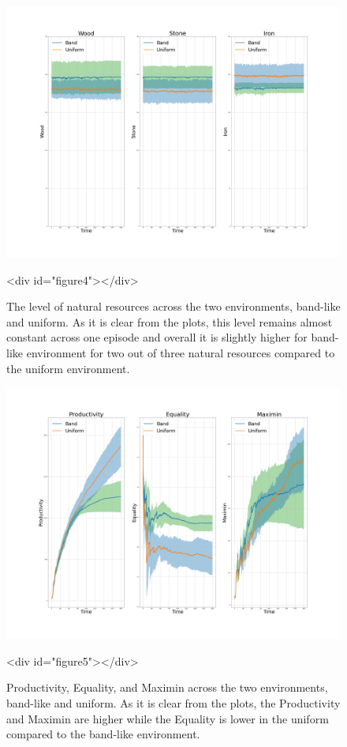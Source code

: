 \documentclass{article}
\begin{document}
\begin{figure}
\centering
\includegraphics[width=0.7\linewidth]{"A_Multi-agent_Reinforcement_Learning_Study_of_Emergence_of_Social_Classes_out_of_Arbitrary_Governance_The_Role_of_Environment_Plots/Amount_of_Three_Material_Resources_across_an_Episode_for_Two_Scenarios"}
\caption{The level of natural resources across the two environments, band-like and uniform. As it is clear from the plots, this level remains almost constant across one episode and overall it is slightly higher for band-like environment for two out of three natural resources compared to the uniform environment.}
<div id="figure4"></div>

\end{figure}

\begin{figure}
\centering
\includegraphics[width=0.7\linewidth]{"A_Multi-agent_Reinforcement_Learning_Study_of_Emergence_of_Social_Classes_out_of_Arbitrary_Governance_The_Role_of_Environment_Plots/Productivity,_Equality,_and_Maximin_across_an_Episode_for_Two_Scenarios"}
\caption{Productivity, Equality, and Maximin across the two environments, band-like and uniform. As it is clear from the plots, the Productivity and Maximin are higher while the Equality is lower in the uniform compared to the band-like environment.}
<div id="figure5"></div>

\end{figure}
\end{document}
